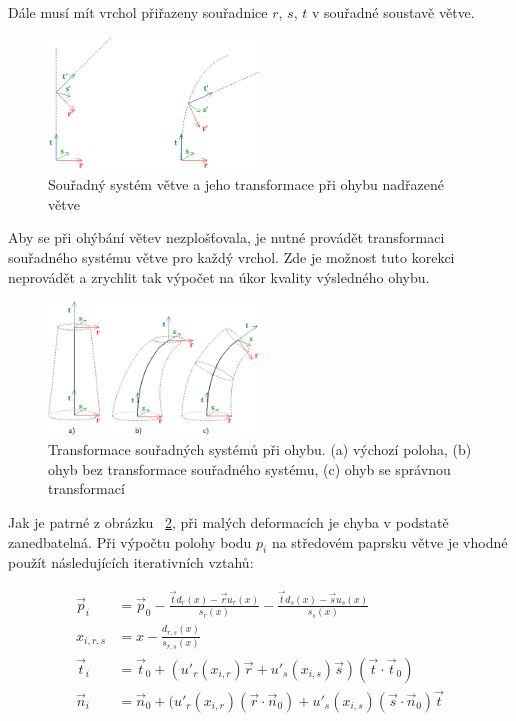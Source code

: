 Dále musí mít vrchol přiřazeny souřadnice $r$, $s$, $t$ v souřadné soustavě větve.
\begin{figure}[!hbt]
\begin{center}
\includegraphics[width=0.5\textwidth]{./figures/coordTransf.png}
\end{center}
\caption{ Souřadný systém větve a jeho transformace při ohybu nadřazené větve
\label{fig:transfCoordSys}
}
\end{figure}	 
Aby se při ohýbání větev nezplošťovala, je nutné provádět transformaci souřadného systému větve pro každý vrchol. Zde je možnost tuto korekci neprovádět a zrychlit tak výpočet na úkor kvality výsledného ohybu.

	 
\begin{figure}[!hbt]
\begin{center}
\includegraphics[width=0.5\textwidth]{./figures/branchBend.png}
\end{center}
\caption[Transformace souřadných systémů při ohybu]%
{Transformace souřadných systémů při ohybu.
(a) výchozí poloha, (b) ohyb bez transformace souřadného systému, (c) ohyb se správnou transformací
\label{fig:bendCoordSys}
}
\end{figure}

Jak je patrné z obrázku ~\ref{fig:bendCoordSys}, při malých deformacích je chyba v podstatě zanedbatelná. Při výpočtu polohy bodu $p_i$ na středovém paprsku větve je vhodné použít následujících iterativních vztahů:

\begin{align} 
\vec{p}_{i} &= \vec{p}_{0} - \frac{\vec{t}d_{r}(x)-\vec{r}u_{r}(x)}{s_{r}(x)}-\frac{\vec{t}d_{s}(x)-\vec{s}u_{s}(x)}{s_{s}(x)}\nonumber\\
x_{i,r,s} &= x - \frac{d_{r,s}(x)}{s_{r,s}(x)}\nonumber\\
\vec{t}_{i} &=  \vec{t}_{0} + (u'_{r}(x_{i,r})\vec{r} + u'_{s}(x_{i,s})\vec{s})(\vec{t}\cdot\vec{t}_{0})\\
\vec{n}_{i} &=  \vec{n}_{0} + (u'_{r}(x_{i,r})(\vec{r} \cdot \vec{n}_{0}) + u'_{s}(x_{i,s})(\vec{s} \cdot \vec{n}_{0})\vec{t}
\end{align}

